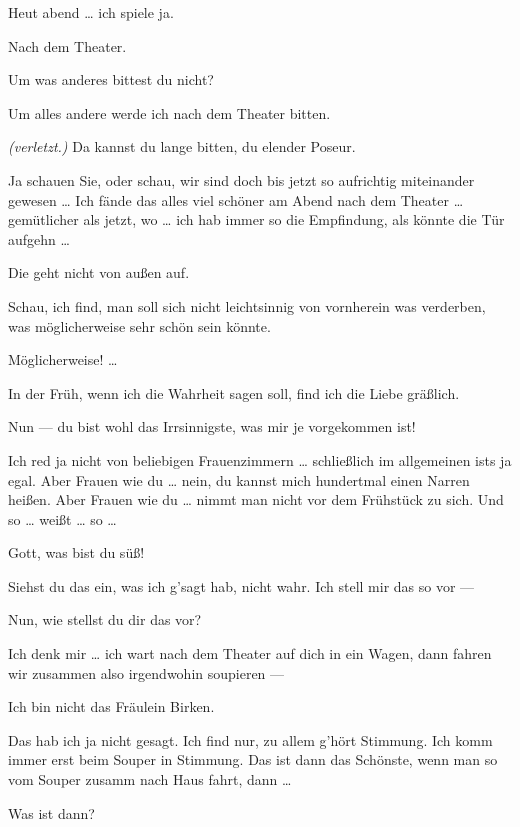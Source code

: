 \documentclass[
	final,
	a4paper,
	ngerman,
	mpinclude = true, %
	twoside = true,
	open = right,
	cleardoublepage = plain,
	DIV = 13,
	BCOR = 1cm,
	titlepage = firstiscover,
	]{scrbook}
\newcommand{\direction}[1]{\textit{(#1)}}
\newcommand{\thecharacter}[1]{\textup{\textsc{#1}}\xspace}
\newcommand{\theschauspielerin}{\thecharacter{Schauspielerin}}
\newcommand{\thegraf}{\thecharacter{Graf}}
\newcommand{\character}[1]{\item[#1:]}
\newcommand{\schauspielerin}{\character{\theschauspielerin}}
\newcommand{\graf}{\character{\thegraf}}
\begin{document}
\begin{play}
	\schauspielerin
	Heut abend \ldots{} ich spiele ja.

	\graf
	Nach dem Theater.

	\schauspielerin
	Um was anderes bittest du nicht?

	\graf
	Um alles andere werde ich nach dem Theater bitten.

	\schauspielerin
	\direction{verletzt.} Da kannst du lange bitten, du elender Poseur.

	\graf
	Ja schauen Sie, oder schau, wir sind doch bis jetzt so aufrichtig miteinander gewesen \ldots{} Ich fände das alles viel schöner am Abend nach dem Theater \ldots{} gemütlicher als jetzt, wo \ldots{} ich hab immer so die Empfindung, als könnte die Tür aufgehn \ldots{}

	\schauspielerin
	Die geht nicht von außen auf.

	\graf
	Schau, ich find, man soll sich nicht leichtsinnig von vornherein was verderben, was möglicherweise sehr schön sein könnte.

	\schauspielerin
	Möglicherweise! \ldots{}

	\graf
	In der Früh, wenn ich die Wahrheit sagen soll, find ich die Liebe gräßlich.

	\schauspielerin
	Nun --- du bist wohl das Irrsinnigste, was mir je vorgekommen ist!

	\graf
	Ich red ja nicht von beliebigen Frauenzimmern \ldots{} schließlich im allgemeinen ists ja egal. Aber Frauen wie du \ldots{} nein, du kannst mich hundertmal einen Narren heißen. Aber Frauen wie du \ldots{} nimmt man nicht vor dem Frühstück zu sich. Und so \ldots{} weißt \ldots{} so \ldots{}

	\schauspielerin
	Gott, was bist du süß!

	\graf
	Siehst du das ein, was ich g'sagt hab, nicht wahr. Ich stell mir das so vor ---

	\schauspielerin
	Nun, wie stellst du dir das vor?

	\graf
	Ich denk mir \ldots{} ich wart nach dem Theater auf dich in ein Wagen, dann fahren wir zusammen also irgendwohin soupieren ---

	\schauspielerin
	Ich bin nicht das Fräulein Birken.

	\graf
	Das hab ich ja nicht gesagt. Ich find nur, zu allem g'hört Stimmung. Ich komm immer erst beim Souper in Stimmung. Das ist dann das Schönste, wenn man so vom Souper zusamm nach Haus fahrt, dann \ldots{}

	\schauspielerin
	Was ist dann?


\end{play}
\end{document}
